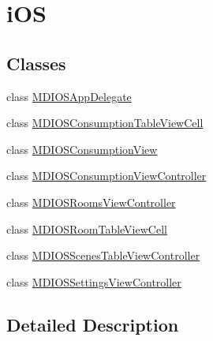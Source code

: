 \hypertarget{group__i_o_s}{\section{i\-O\-S}
\label{group__i_o_s}
}
\subsection*{Classes}
\begin{DoxyCompactItemize}
\item 
class \hyperlink{interface_m_d_i_o_s_app_delegate}{M\-D\-I\-O\-S\-App\-Delegate}
\item 
class \hyperlink{interface_m_d_i_o_s_consumption_table_view_cell}{M\-D\-I\-O\-S\-Consumption\-Table\-View\-Cell}
\item 
class \hyperlink{interface_m_d_i_o_s_consumption_view}{M\-D\-I\-O\-S\-Consumption\-View}
\item 
class \hyperlink{interface_m_d_i_o_s_consumption_view_controller}{M\-D\-I\-O\-S\-Consumption\-View\-Controller}
\item 
class \hyperlink{interface_m_d_i_o_s_rooms_view_controller}{M\-D\-I\-O\-S\-Rooms\-View\-Controller}
\item 
class \hyperlink{interface_m_d_i_o_s_room_table_view_cell}{M\-D\-I\-O\-S\-Room\-Table\-View\-Cell}
\item 
class \hyperlink{interface_m_d_i_o_s_scenes_table_view_controller}{M\-D\-I\-O\-S\-Scenes\-Table\-View\-Controller}
\item 
class \hyperlink{interface_m_d_i_o_s_settings_view_controller}{M\-D\-I\-O\-S\-Settings\-View\-Controller}
\end{DoxyCompactItemize}


\subsection{Detailed Description}
